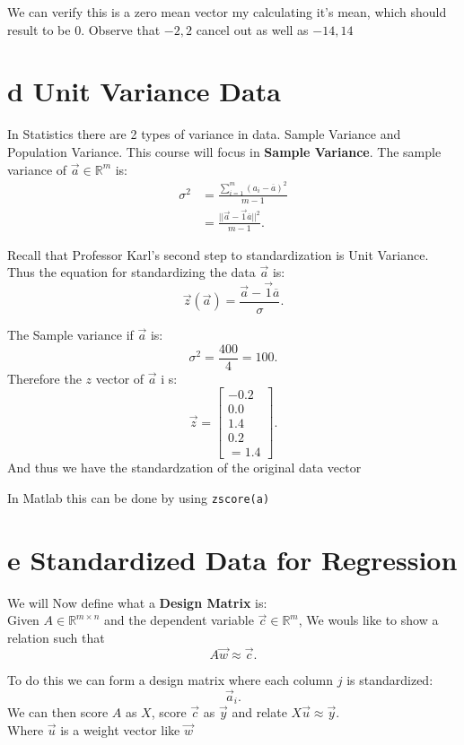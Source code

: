 \documentclass[12pt]{book}
\begin{document}
We can verify this is a zero mean vector my calculating it's mean, which should result to be 0. Observe that $-2,2$ cancel out  
        as well as $-14,14$


\section*{d Unit Variance Data}
In Statistics there are 2 types of variance in data. Sample Variance and Population Variance.
This course will focus in \textbf{Sample Variance}.
The sample variance of $\vec a \in \mathbb{R}^m$ is:
\begin{align*}
        \sigma^2 &= \frac{\sum^m_{i=1} \left( a_i-\overline{a} \right)^2 }{m-1}\\
         &= \frac{||\vec a-\vec 1 \overline{a}||^2}{m-1}
.\end{align*} 

Recall that Professor Karl's second step to standardization is Unit Variance. Thus the equation for standardizing the data $\vec a$ is: 
\[
\vec z(\vec a)=\frac{\vec a-\vec 1\overline{a}}{\sigma}
.\] 

The Sample variance if $\vec a$ is:
 \[
\sigma^2 = \frac{400}{4} = 100
.\] 
Therefore the $z$ vector of $\vec a$ i s:
\[
\vec z = \begin{bmatrix} -0.2\\0.0\\1.4\\0.2\\=1.4 \end{bmatrix} 
.\] 
And thus we have the standardzation of the original data vector

In Matlab this can be done by using \texttt{zscore(a)}
\pagebreak


\section*{e Standardized Data for Regression}
We will Now define what a \textbf{Design Matrix} is:\\
Given $A\in\mathbb{R}^{m\times n}$ and the dependent variable $\vec c\in\mathbb{R}^m$, We wouls like to show a relation such that
\[
A\vec w\approx \vec c
.\] 

To do this we can form a design matrix where each column $j$ is standardized:
 \[
\vec a_i
.\] 
We can then score $A$ as  $X$, score  $\vec c$ as  $\vec y$ and relate  $X\vec u \approx \vec y$.\\
Where $\vec u$ is a weight vector like  $\vec w$
\end{document}

